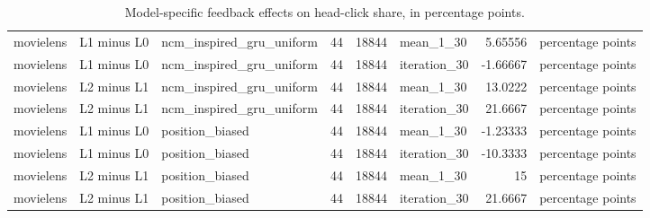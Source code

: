 \begin{table}[htbp!]
\begin{tabular}{lllrrlrl}
movielens & L1 minus L0 & ncm\_inspired\_gru\_uniform & 44 & 18844 & mean\_1\_30 & 5.65556 & percentage points \\
movielens & L1 minus L0 & ncm\_inspired\_gru\_uniform & 44 & 18844 & iteration\_30 & -1.66667 & percentage points \\
movielens & L2 minus L1 & ncm\_inspired\_gru\_uniform & 44 & 18844 & mean\_1\_30 & 13.0222 & percentage points \\
movielens & L2 minus L1 & ncm\_inspired\_gru\_uniform & 44 & 18844 & iteration\_30 & 21.6667 & percentage points \\
movielens & L1 minus L0 & position\_biased & 44 & 18844 & mean\_1\_30 & -1.23333 & percentage points \\
movielens & L1 minus L0 & position\_biased & 44 & 18844 & iteration\_30 & -10.3333 & percentage points \\
movielens & L2 minus L1 & position\_biased & 44 & 18844 & mean\_1\_30 & 15 & percentage points \\
movielens & L2 minus L1 & position\_biased & 44 & 18844 & iteration\_30 & 21.6667 & percentage points \\
\hline
\end{tabular}
\caption{Model-specific feedback effects on head-click share, in percentage points.}
\label{chap:results:tab:rq2_model_feedback_head_clicks}
\end{table}

